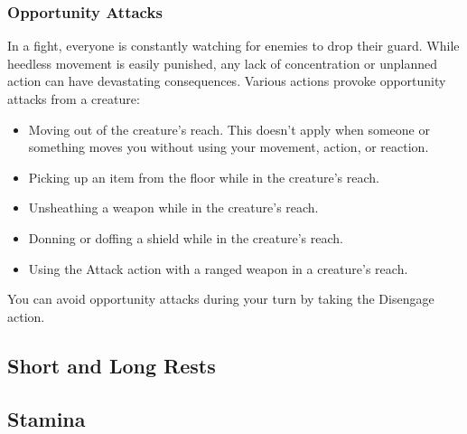\subsubsection*{Opportunity Attacks}
In a fight, everyone is constantly watching for enemies to drop their guard.
While heedless movement is easily punished, any lack of concentration or unplanned action can have devastating consequences.
Various actions provoke opportunity attacks from a creature:
\begin{itemize}
    \item Moving out of the creature's reach.
    This doesn't apply when someone or something moves you without using your movement, action, or reaction.
    \item Picking up an item from the floor while in the creature's reach.
    \item Unsheathing a weapon while in the creature's reach.
    \item Donning or doffing a shield while in the creature's reach.
    \item Using the Attack action with a ranged weapon in a creature's reach.
\end{itemize}
You can avoid opportunity attacks during your turn by taking the Disengage action.

\subsection*{Short and Long Rests}

\subsection*{Stamina}
